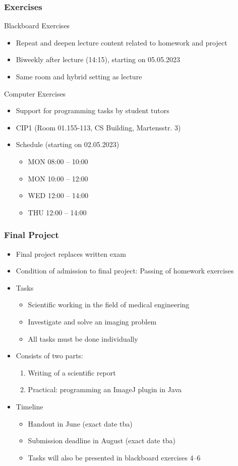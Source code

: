 \begin{frame}
	\frametitle{Exercises}
	\begin{block}{Blackboard Exercises}
		\begin{itemize}
			\item Repeat and deepen lecture content related to homework and project
			\item Biweekly after lecture (14:15), starting on 05.05.2023
			\item Same room and hybrid setting as lecture
		\end{itemize}
	\end{block}
	\begin{block}{Computer Exercises}
		\begin{itemize}
			\item Support for programming tasks by student tutors
			\item CIP1 (Room 01.155-113, CS Building, Martensstr. 3)
			\item Schedule (starting on 02.05.2023)
			\begin{itemize}
				\item MON 08:00 -- 10:00
				\item MON 10:00 -- 12:00
				\item WED 12:00 -- 14:00
				\item THU 12:00 -- 14:00
			\end{itemize}
		\end{itemize}
	\end{block}
\end{frame}

\begin{frame}
	\frametitle{Final Project}
	\begin{itemize}
		\item Final project replaces written exam
		\item Condition of admission to final project: Passing of homework exercises
		\item Tasks
		\begin{itemize}
			\item Scientific working in the field of medical engineering
			\item Investigate and solve an imaging problem
			\item All tasks must be done individually
		\end{itemize}
		\item Consists of two parts:
		\begin{enumerate}
			\item Writing of a scientific report
			\item Practical: programming an ImageJ plugin in Java
		\end{enumerate}
		\item Timeline
		\begin{itemize}
			\item Handout in June (exact date tba)
			\item Submission deadline in August (exact date tba)
			\item Tasks will also be presented in blackboard exercises 4--6
		\end{itemize}
	\end{itemize}
\end{frame}

